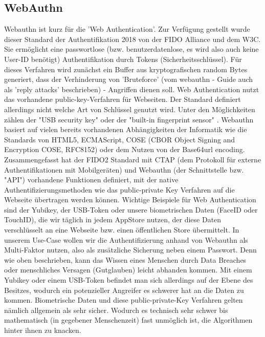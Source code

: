 \subsection{WebAuthn}
Webauthn ist kurz für die 'Web Authentication'. Zur Verfügung gestellt wurde dieser Standard der Authentifikation 2018 von der FIDO Alliance und dem W3C. \cite{A7} Sie ermöglicht eine passwortlose (bzw. benutzerdatenlose, es wird also auch keine User-ID benötigt) Authentifikation durch Tokens (Sicherheitsschlüssel). Für dieses Verfahren wird zunächst ein Buffer aus kryptografischen random Bytes generiert, dass der Verhinderung von 'Bruteforce' (vom webauthn - Guide auch als 'reply attacks' beschrieben) - Angriffen dienen soll. Web Authentication nutzt das vorhandene public-key-Verfahren für Webseiten. Der Standard definiert allerdings nicht welche Art von Schlüssel genutzt wird. Unter den Möglichkeiten zählen der "USB security key" \cite{A7} oder der "built-in fingerprint sensor" \cite{A7}. Webauthn basiert auf vielen bereits vorhandenen Abhängigkeiten der Informatik wie die Standards von HTML5, ECMAScript, COSE (CBOR Object Signing and Encryption COSE, RFC8152) oder dem Nutzen von der Base64url encoding. \\
Zusammengefasst hat der FIDO2 Standard mit CTAP (dem Protokoll für externe Authentifikationen mit Mobilgeräten) und Webauthn (der Schnittstelle bzw. "API") vorhandene Funktionen definiert, mit der native Authentifizierungsmethoden wie das public-private Key Verfahren auf die Webseite übertragen werden können. Wichtige Beispiele für Web Authentication sind der Yubikey, der USB-Token oder unsere biometrischen Daten (FaceID oder TouchID), die wir täglich in jedem AppStore nutzen, der diese Daten verschlüsselt an eine Webseite bzw. einen öffentlichen Store übermittelt. In unserem Use-Case wollen wir die Authentifizierung anhand von Webauthn als Multi-Faktor nutzen, also als zusätzliche Sicherung neben einem Passwort. Denn wie oben beschrieben, kann das Wissen eines Menschen durch Data Breaches oder menschliches Versagen (Gutglauben) leicht abhanden kommen. Mit einem Yubikey oder einem USB-Token befindet man sich allerdings auf der Ebene des Besitzes, wodurch ein potenzieller Angreifer es schwerer hat an die Daten zu kommen. Biometrische Daten und diese public-private-Key Verfahren gelten nämlich allgemein als sehr sicher. Wodurch es technisch sehr schwer bis mathematisch (in gegebener Menschenzeit) fast unmöglich ist, die Algorithmen hinter ihnen zu knacken.
